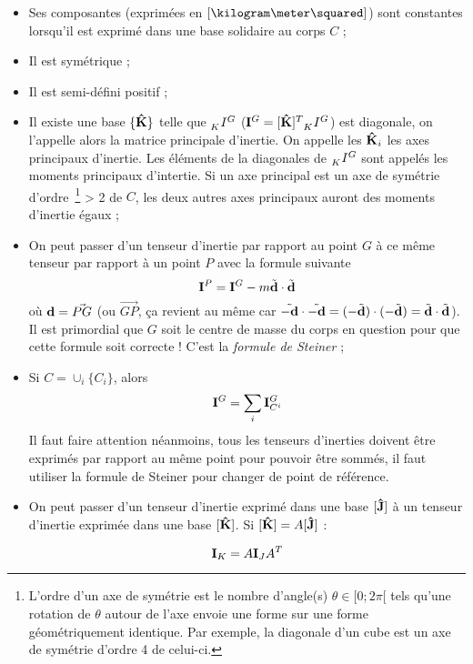\begin{itemize}
  \item Ses composantes (exprimées en $[\kilogram\meter\squared]$) sont constantes lorsqu'il 
	est exprimé dans une base solidaire au corps $C$ ;
  \item Il est symétrique ; 
  \item Il est semi-défini positif ;
  \item
    Il existe une base $\{{\bf\hat{K}}\}$ telle que $\wtr{K}{I}{G}$ ($\ine^G = [\uk]^T \wtr{K}{I}{G}$) 
		est diagonale, on l'appelle alors la matrice principale d'inertie.
    On appelle les ${\bf\hat{K}}_i$ les axes principaux d'inertie.
    Les éléments de la diagonales de $\wtr{K}{I}{G}$ sont appelés les moments principaux d'intertie.
    Si un axe principal est un axe de symétrie d'ordre~\footnote{L'ordre d'un axe de symétrie est le nombre d'angle(s) $\theta \in [0; 2\pi[$ tels qu'une rotation de $\theta$ autour de l'axe envoie une forme sur une forme géométriquement identique.
    Par exemple, la diagonale d'un cube est un axe de symétrie d'ordre 4 de celui-ci.}
    > 2 de $C$, les deux autres axes principaux auront des moments d'inertie égaux ;
  \item
    On peut passer d'un tenseur d'inertie par rapport au point $G$ à ce même tenseur par rapport à un point $P$ avec la formule suivante
    \[ {\bf I}^P =  {\bf I}^G - m \tilde{{\bf d}}\cdot\tilde{{\bf d}} \]
    où ${\bf d} = \vec{PG}$ (ou $\vec{GP}$, ça revient au même car $\tilde{-{\bf d}}\cdot\tilde{-{\bf d}} = (-\tilde{{\bf d}})\cdot(-\tilde{{\bf d}}) = \tilde{{\bf d}}\cdot\tilde{{\bf d}}$).
    Il est primordial que $G$ soit le centre de masse du corps en question pour que cette formule soit correcte !
    C'est la {\em formule de Steiner} ;
  \item
    Si $C = \cup_i \{C_i\}$, alors
    \[ {\bf I}^G = \sum_i {\bf I}_{C^i}^G \]
    Il faut faire attention néanmoins, tous les tenseurs d'inerties doivent
    être exprimés par rapport au même point pour pouvoir être sommés,
    il faut utiliser la formule de
    Steiner pour changer de point de référence.
	\item On peut passer d'un tenseur d'inertie exprimé dans une base $[{\bf\hat{J}}]$ à un 
	tenseur d'inertie exprimée dans une base $[{\bf\hat{K}}]$. Si $[{\bf\hat{K}}] = A[{\bf\hat{J}}]$ :
	
	$${\bf I}_K = A {\bf I}_J A^T$$
\end{itemize}

